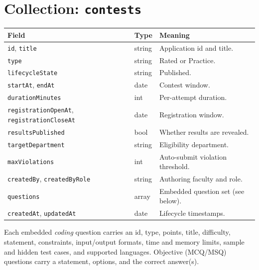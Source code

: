 \documentclass[12pt,a4paper,oneside]{report}
\newcommand{\code}[1]{\texttt{#1}}
\begin{document}
\section{Collection: \code{contests}}
\begin{xltabular}{\linewidth}{@{}l l X@{}}
\toprule
\textbf{Field} & \textbf{Type} & \textbf{Meaning}\\
\midrule
\endhead
\code{id}, \code{title} & string & Application id and title.\\
\code{type} & string & Rated or Practice.\\
\code{lifecycleState} & string & Published.\\
\code{startAt}, \code{endAt} & date & Contest window.\\
\code{durationMinutes} & int & Per-attempt duration.\\
\code{registrationOpenAt}, \code{registrationCloseAt} & date & Registration window.\\
\code{resultsPublished} & bool & Whether results are revealed.\\
\code{targetDepartment} & string & Eligibility department.\\
\code{maxViolations} & int & Auto-submit violation threshold.\\
\code{createdBy}, \code{createdByRole} & string & Authoring faculty and role.\\
\code{questions} & array & Embedded question set (see below).\\
\code{createdAt}, \code{updatedAt} & date & Lifecycle timestamps.\\
\bottomrule
\end{xltabular}

\noindent Each embedded \emph{coding} question carries an id, type, points, title,
difficulty, statement, constraints, input/output formats, time and memory limits,
sample and hidden test cases, and supported languages. Objective (MCQ/MSQ)
questions carry a statement, options, and the correct answer(s).
\end{document}
